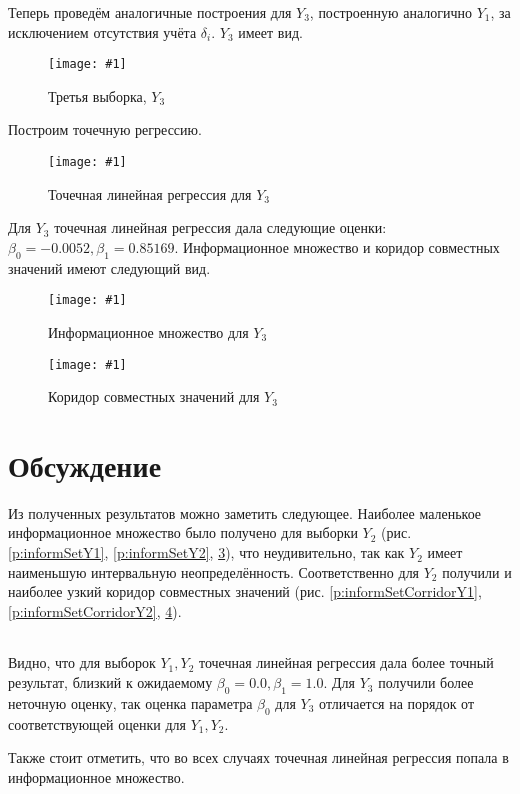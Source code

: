 \documentclass[a4paper,12pt]{article}
\newcommand{\plot}[3]{
    \begin{figure}[H]
        \begin{center}
            \texttt{[image: \#1]}
            \caption{#2}
            \label{#3}
        \end{center}
    \end{figure}
}
\begin{document}
    Теперь проведём аналогичные построения для $ Y_3 $, построенную аналогично $ Y_1 $,
    за исключением отсутствия учёта $ \delta_i $.
    $ Y_3 $ имеет вид.
    \plot{Y3}{Третья выборка, $ Y_3 $}{p:sampleY3}

    Построим точечную регрессию.
    \plot{PointRegressionY3}{Точечная линейная регрессия для $ Y_3 $}{p:regressionY3}

    Для $ Y_3 $ точечная линейная регрессия дала следующие оценки: $ \beta_0 = -0.0052, \beta_1 = 0.85169 $.
    Информационное множество и коридор совместных значений имеют следующий вид.

    \plot{InformSetY3}{Информационное множество для $ Y_3 $}{p:informSetY3}
    \plot{informSetCorridorY3}{Коридор совместных значений для $ Y_3 $}{p:informSetCorridorY3}

    \section{Обсуждение}
    \quad Из полученных результатов можно заметить следующее.
    Наиболее маленькое информационное множество было получено для выборки $ Y_2 $
    (рис. \ref{p:informSetY1}, \ref{p:informSetY2}, \ref{p:informSetY3}),
    что неудивительно, так как $ Y_2 $ имеет наименьшую интервальную неопределённость.
    Соответственно для $ Y_2 $ получили и наиболее узкий коридор совместных значений
    (рис. \ref{p:informSetCorridorY1}, \ref{p:informSetCorridorY2}, \ref{p:informSetCorridorY3}).

    \begin{table}
        \begin{tabular}{| c | c | c |}
            
        \end{tabular}
    \end{table}

    
    Видно, что для выборок $ Y_1, Y_2 $ точечная линейная регрессия дала более точный результат,
    близкий к ожидаемому $ \beta_0 = 0.0, \beta_1 = 1.0 $. Для $ Y_3 $ получили более неточную оценку,
    так оценка параметра $ \beta_0 $ для $ Y_3 $ отличается на порядок от соответствующей оценки для $ Y_1, Y_2 $.

    Также стоит отметить, что во всех случаях точечная линейная регрессия попала в информационное множество.
\end{document}
